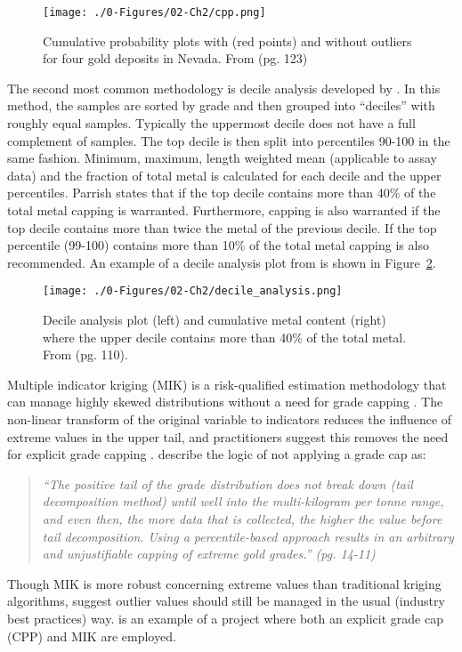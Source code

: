 \begin{figure}[htb!]
    \centering
    \texttt{[image: ./0-Figures/02-Ch2/cpp.png]}
    \caption{Cumulative probability plots with (red points) and without outliers for four gold deposits in Nevada. From \cite{fiore2021} (pg. 123)}
    \label{fig:cpp}
\end{figure}

The second most common methodology is decile analysis developed by \cite{parrish1997geologist}. In this method, the samples are sorted by grade and then grouped into ``deciles'' with roughly equal samples. Typically the uppermost decile does not have a full complement of samples. The top decile is then split into percentiles 90-100 in the same fashion. Minimum, maximum, length weighted mean (applicable to assay data) and the fraction of total metal is calculated for each decile and the upper percentiles. Parrish states that if the top decile contains more than 40\% of the total metal capping is warranted. Furthermore, capping is also warranted if the top decile contains more than twice the metal of the previous decile. If the top percentile (99-100) contains more than 10\% of the total metal capping is also recommended. An example of a decile analysis plot from \cite{cartier2020} is shown in Figure~\ref{fig:decile}.

\begin{figure}[htb!]
    \centering
    \texttt{[image: ./0-Figures/02-Ch2/decile\_analysis.png]}
    \caption{Decile analysis plot (left) and cumulative metal content (right) where the upper decile contains more than 40\% of the total metal. From \cite{cartier2020} (pg. 110).}
    \label{fig:decile}
\end{figure}

Multiple indicator kriging (MIK) is a risk-qualified estimation methodology that can manage highly skewed distributions without a need for grade capping \citep{journel1983nonparametric}. The non-linear transform of the original variable to indicators reduces the influence of extreme values in the upper tail, and practitioners suggest this removes the need for explicit grade capping \citep{pretium2020, ngm2020, tristar2021, cardinal2019}. \cite{pretium2020} describe the logic of not applying a grade cap as:
\blockquote{\textit{``The positive tail of the grade distribution does
not break down (tail decomposition method) until well into the multi-kilogram per tonne range, and even then, the more data that is collected, the higher the value before tail decomposition. Using a percentile-based approach results in an arbitrary and unjustifiable capping of extreme gold grades.'' (pg. 14-11)}}
Though MIK is more robust concerning extreme values than traditional kriging algorithms, \cite{carvalho2017overview} suggest outlier values should still be managed in the usual (industry best practices) way. \cite{artemis2020} is an example of a project where both an explicit grade cap (CPP) and MIK are employed. 

